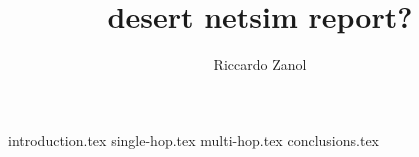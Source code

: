 \documentclass[a4paper,twoside,twocolumn]{article}
\author{Riccardo Zanol}
\title{desert netsim report?}
\begin{document}
\maketitle

{introduction.tex}
{single-hop.tex}
{multi-hop.tex}
{conclusions.tex}

\printbibliography
\end{document}
